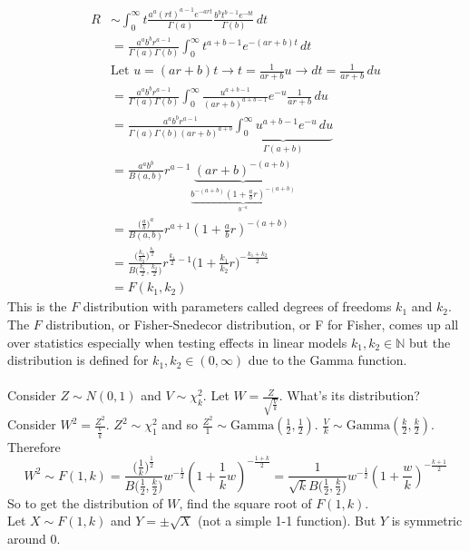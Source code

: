 \documentclass[12pt]{article}
\begin{document}
$$ \begin{aligned} R &\sim \int_0^\infty t \frac{a^a (rt)^{a - 1}e^{-art}}{\Gamma(a)} \frac{b^b t^{b-1}e^{-bt}}{\Gamma(b)} \, dt \\ &= \frac{a^ab^br^{a-1}}{\Gamma(a)\Gamma(b)} \int_0^\infty t^{a + b - 1} e^{-(ar + b)t} \, dt \\ &\text{Let } u = (ar + b)t \to t = \frac{1}{ar + b}u \to dt = \frac{1}{ar + b} \, du \\ &= \frac{a^a b^b r^{a-1}}{\Gamma(a)\Gamma(b)} \int_0^\infty \frac{u^{a + b - 1}}{(ar + b)^{a + b - 1}} e^{-u} \frac{1}{ar + b} \, du \\ &= \frac{a^a b^b r^{a-1}}{\Gamma(a)\Gamma(b)(ar + b)^{a + b}}\underbrace{\int_0^\infty u^{a + b - 1} e^{-u} \, du}_{\Gamma(a+b)} \\ &= \frac{a^a b^b}{B(a, b)} r^{a - 1} \underbrace{(ar + b)^{-(a + b)}}_{\underbrace{b^{-(a + b)} (1 + \frac{a}{b}r)^{-(a + b)}}_{b^{-a}}} \\ &= \frac{\Big( \frac{a}{b}\Big)^a}{B(a, b)} r^{a + 1} (1 + \frac{a}{b}r)^{-(a + b)} \\ &= \frac{\Big( \frac{k_1}{k_2}\Big)^{\frac{k_1}{2}}}{B\Big( \frac{k_1}{2}, \frac{k_2}{2}\Big)} r^{\frac{k_1}{2} - 1} \Big(1 + \frac{k_1}{k_2}r)^{- \frac{k_1 + k_2}{2}} \\ &= F(k_1, k_2) \end{aligned} $$ 
This is the $F$ distribution with parameters called degrees of freedoms $k_1$ and $k_2$. The $F$ distribution, or Fisher-Snedecor distribution, or F for Fisher, comes up all over statistics especially when testing effects in linear models $k_1, k_2 \in \mathbb{N}$ but the distribution is defined for $k_1, k_2 \in (0, \infty)$ due to the Gamma function. \\~\\
Consider $Z \sim N(0,1)$ and $V \sim \chi^2_k$. Let $W = \frac{Z}{\sqrt{\frac{V}{k}}}$. What's its distribution? Consider $W^2 = \frac{Z^2}{\frac{V}{k}}$. $Z^2 \sim \chi^2_1$ and so $\frac{Z^2}{1} \sim \text{Gamma}(\frac{1}{2}, \frac{1}{2})$. $\frac{V}{k} \sim \text{Gamma}(\frac{k}{2}, \frac{k}{2})$. Therefore $$ W^2 \sim F(1,k) = \frac{\Big(\frac{1}{k}\Big)^{\frac{1}{2}}}{B\Big(\frac{1}{2}, \frac{k}{2}\Big)} w^{-\frac{1}{2}}(1 + \frac{1}{k}w)^{- \frac{1 + k}{2}} = \frac{1}{\sqrt{k}B\Big( \frac{1}{2}, \frac{k}{2}\Big)} w^{-\frac{1}{2}} (1 + \frac{w}{k})^{- \frac{k + 1}{2}} $$ So to get the distribution of $W$, find the square root of $F(1,k)$. \\
Let $X \sim F(1,k)$ and $Y = \pm \sqrt{X}$ (not a simple 1-1 function). But $Y$ is symmetric around 0. 
\end{document}
